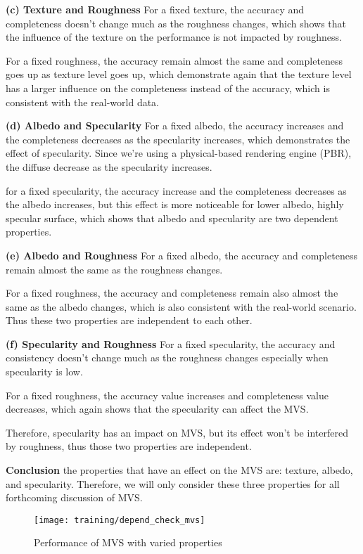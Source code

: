 \textbf{(c) Texture and Roughness} 
For a fixed texture, the accuracy and completeness doesn't change much as the roughness changes, which shows that the influence of the texture on the performance is not impacted by roughness.

For a fixed roughness, the accuracy remain almost the same and completeness goes up as texture level goes up, which demonstrate again that the texture level has a larger influence on the completeness instead of the accuracy, which is consistent with the real-world data.

\textbf{(d) Albedo and Specularity} 
For a fixed albedo, the accuracy increases and the completeness decreases as the specularity increases, which demonstrates the effect of specularity. Since we're using a physical-based rendering engine (PBR), the diffuse decrease as the specularity increases.

for a fixed specularity, the accuracy increase and the completeness decreases as the albedo increases, but this effect is more noticeable for lower albedo, highly specular surface, which shows that albedo and specularity are two dependent properties.

\textbf{(e) Albedo and Roughness} 
For a fixed albedo, the accuracy and completeness remain almost the same as the roughness changes.

For a fixed roughness, the accuracy and completeness remain also almost the same as the albedo changes, which is also consistent with the real-world scenario. Thus these two properties are independent to each other.

\textbf{(f) Specularity and Roughness} 
For a fixed specularity, the accuracy and consistency doesn't change much as the roughness changes especially when specularity is low.

For a fixed roughness, the accuracy value increases and completeness value decreases, which again shows that the specularity can affect the MVS.

Therefore, specularity has an impact on MVS, but its effect won't be interfered by roughness, thus those two properties are independent.

\textbf{Conclusion} the properties that have an effect on the MVS are: texture, albedo, and specularity. Therefore, we will only consider these three properties for all forthcoming discussion of MVS.

\begin{figure}[h!]
\texttt{[image: training/depend\_check\_mvs]}
\caption{Performance of MVS with varied properties}
\label{fig:depend_check_mvs}
\end{figure}

